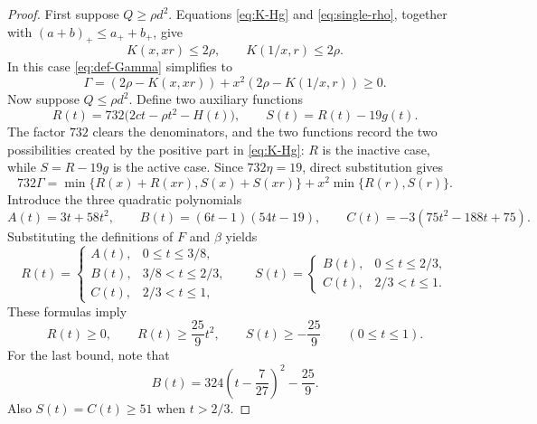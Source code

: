 \documentclass[10pt,a4paper]{amsart}
\begin{document}
\begin{proof}
First suppose $Q\ge\rho d^2$.  Equations \eqref{eq:K-Hg} and
\eqref{eq:single-rho}, together with
$(a+b)_+\le a_++b_+$, give
\[
 K(x,xr)\le2\rho,
 \qquad
 K(1/x,r)\le2\rho.
\]
In this case \eqref{eq:def-Gamma} simplifies to
\[
 \Gamma=(2\rho-K(x,xr))
 +x^2(2\rho-K(1/x,r))\ge0.
\]
Now suppose $Q\le\rho d^2$.  Define two auxiliary functions
\begin{equation}\label{eq:def-RS}
 R(t)=732\bigl(2ct-\rho t^2-H(t)\bigr),
 \qquad
 S(t)=R(t)-19g(t).
\end{equation}
The factor $732$ clears the denominators, and the two functions record the
two possibilities created by the positive part in \eqref{eq:K-Hg}: $R$ is
the inactive case, while $S=R-19g$ is the active case.  Since
$732\eta=19$, direct substitution gives
\begin{equation}\label{eq:min-RS}
 732\Gamma
 =\min\{R(x)+R(xr),S(x)+S(xr)\}
 +x^2\min\{R(r),S(r)\}.
\end{equation}
Introduce the three quadratic polynomials
\begin{equation}\label{eq:def-ABC}
 A(t)=3t+58t^2,
 \qquad
 B(t)=(6t-1)(54t-19),
 \qquad
 C(t)=-3(75t^2-188t+75).
\end{equation}
Substituting the definitions of $F$ and $\beta$ yields
\begin{equation}\label{eq:R-pieces}
 R(t)=
 \begin{cases}
 A(t),&0\le t\le3/8,\\
 B(t),&3/8<t\le2/3,\\
 C(t),&2/3<t\le1,
 \end{cases}
 \qquad
 S(t)=
 \begin{cases}
 B(t),&0\le t\le2/3,\\
 C(t),&2/3<t\le1.
 \end{cases}
\end{equation}
These formulas imply
\begin{equation}\label{eq:RS-basic}
 R(t)\ge0,
 \qquad
 R(t)\ge\frac{25}{9}t^2,
 \qquad
 S(t)\ge-\frac{25}{9}
 \qquad(0\le t\le1).
\end{equation}
For the last bound, note that
\begin{equation}\label{eq:B-square}
 B(t)=324\left(t-\frac7{27}\right)^2-\frac{25}{9}.
\end{equation}
Also $S(t)=C(t)\ge51$ when $t>2/3$.


\end{proof}
\end{document}
